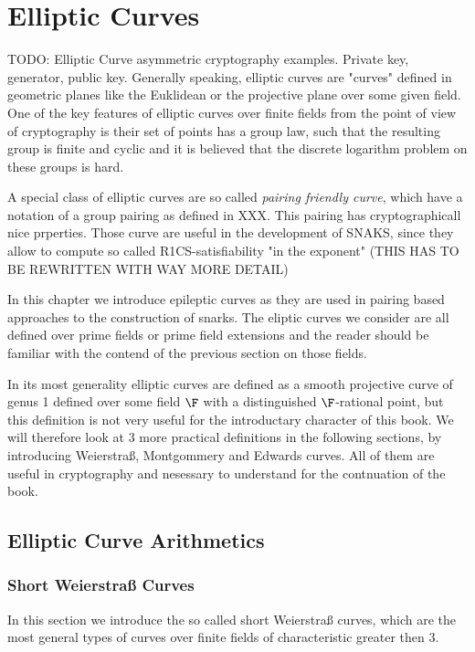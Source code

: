 \chapter{Elliptic Curves}
TODO: Elliptic Curve asymmetric cryptography examples. Private key, generator, public key. 
Generally speaking, elliptic curves are "curves" defined in geometric planes like the Euklidean or the projective plane over some given field. One of the key features of elliptic curves over finite fields from the point of view of cryptography is their set of points has a group law, such that the resulting group is finite and cyclic and it is believed that the discrete logarithm problem on these groups is hard. 

A special class of elliptic curves are so called \textit{pairing friendly curve}, which have a notation of a group pairing as defined in XXX. This pairing has cryptographicall nice prperties. Those curve are useful in the development of SNAKS, since they allow to compute so called R1CS-satisfiability "in the exponent" (THIS HAS TO BE REWRITTEN WITH WAY MORE DETAIL)

In this chapter we introduce epileptic curves as they are used in pairing based approaches to the construction of snarks. The eliptic curves we consider are all defined over prime fields or prime field extensions and the reader should be familiar with the contend of the previous section on those fields.

In its most generality elliptic curves are defined as a smooth projective curve of genus 1 defined over some field $\F$ with a distinguished $\F$-rational point, but this definition is not very useful for the introductary character of this book. We will therefore look at $3$ more practical definitions in the following sections, by introducing Weierstraß, Montgommery and Edwards curves. All of them are useful in cryptography and nesessary to understand for the contnuation of the book.

\section{Elliptic Curve Arithmetics}

\subsection{Short Weierstraß Curves}
In this section we introduce the so called short Weierstraß curves, which are the most general types of curves over finite fields of characteristic greater then $3$. 

